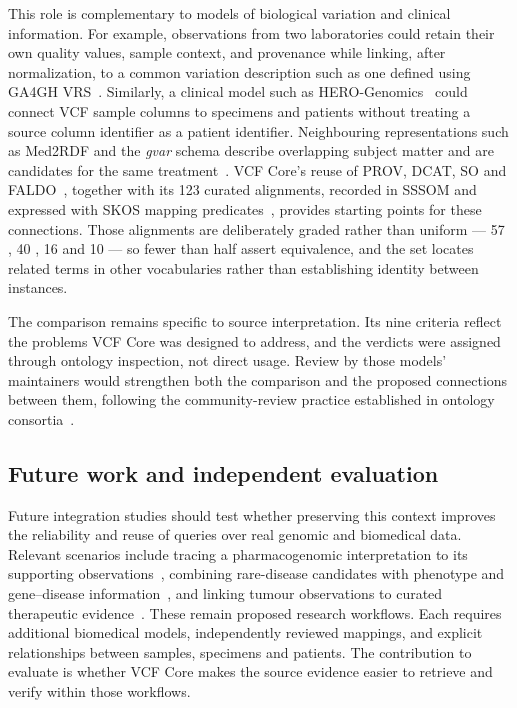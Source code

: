 This role is complementary to models of biological variation and clinical information.
For example, observations from two laboratories could retain their own quality values, sample context, and provenance while linking, after normalization, to a common variation description such as one defined using GA4GH VRS~\cite{wagner2021vrs}.
Similarly, a clinical model such as HERO-Genomics~\cite{cazzaro2025hero} could connect VCF sample columns to specimens and patients without treating a source column identifier as a patient identifier.
Neighbouring representations such as Med2RDF and the \emph{gvar} schema describe overlapping subject matter and are candidates for the same treatment~\cite{med2rdf,gvar}.
VCF Core's reuse of PROV, DCAT, SO and FALDO~\cite{prov2013,eilbeck2005so,bolleman2016faldo}, together with its 123 curated alignments, recorded in SSSOM and expressed with SKOS mapping predicates~\cite{matentzoglu2022sssom,skos2009}, provides starting points for these connections.
Those alignments are deliberately graded rather than uniform --- 57 , 40 , 16  and 10  --- so fewer than half assert equivalence, and the set locates related terms in other vocabularies rather than establishing identity between instances.

The comparison remains specific to source interpretation.
Its nine criteria reflect the problems VCF Core was designed to address, and the verdicts were assigned through ontology inspection, not direct usage.
Review by those models' maintainers would strengthen both the comparison and the proposed connections between them, following the community-review practice established in ontology consortia~\cite{smith2007obo}.

\subsection{Future work and independent evaluation}
\label{sec:clinicalqueries}

Future integration studies should test whether preserving this context improves the reliability and reuse of queries over real genomic and biomedical data.
Relevant scenarios include tracing a pharmacogenomic interpretation to its supporting observations~\cite{lee2022cpic,pharmcatmethods}, combining rare-disease candidates with phenotype and gene--disease information~\cite{hpo,putman2024monarch}, and linking tumour observations to curated therapeutic evidence~\cite{griffith2017civic}.
These remain proposed research workflows.
Each requires additional biomedical models, independently reviewed mappings, and explicit relationships between samples, specimens and patients.
The contribution to evaluate is whether VCF Core makes the source evidence easier to retrieve and verify within those workflows.

